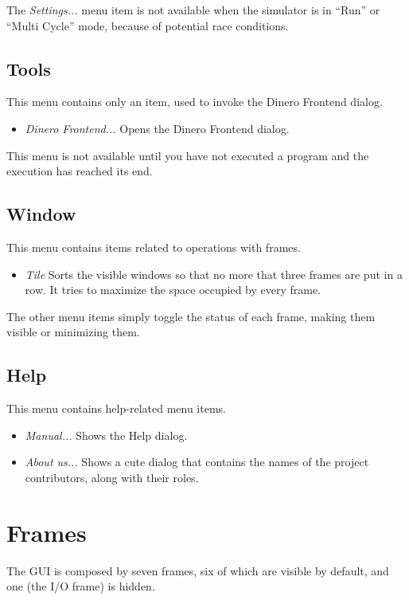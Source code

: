 \documentclass[letterpaper,10pt,english]{sphinxmanual}
\begin{document}
The \emph{Settings...} menu item is not available when the simulator is in
``Run'' or ``Multi Cycle'' mode, because of potential race conditions.


\subsection{Tools}
\label{user-interface:tools}
This menu contains only an item, used to invoke the Dinero Frontend dialog.
\begin{itemize}
\item {} 
\emph{Dinero Frontend...} Opens the Dinero Frontend dialog.

\end{itemize}

This menu is not available until you have not executed a program and the
execution has reached its end.


\subsection{Window}
\label{user-interface:window}
This menu contains items related to operations with frames.
\begin{itemize}
\item {} 
\emph{Tile} Sorts the visible windows so that no more that three
frames are put in a row. It tries to maximize the space occupied by every
frame.

\end{itemize}

The other menu items simply toggle the status of each frame, making them visible
or minimizing them.


\subsection{Help}
\label{user-interface:help}
This menu contains help-related menu items.
\begin{itemize}
\item {} 
\emph{Manual...} Shows the Help dialog.

\item {} 
\emph{About us...} Shows a cute dialog that contains the names of
the project contributors, along with their roles.

\end{itemize}


\section{Frames}
\label{user-interface:frames}
The GUI is composed by seven frames, six of which are visible by default, and
one (the I/O frame) is hidden.
\end{document}
